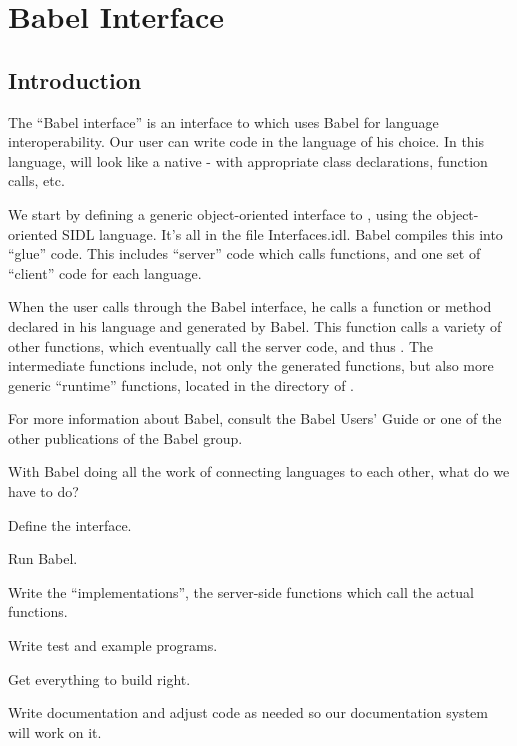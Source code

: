 
\chapter{Babel Interface}
\label{ch-babel}

\section{Introduction}

The ``Babel interface'' is an interface to \hypre{} which uses Babel
for language interoperability.  Our user can write code in the
language of his choice. In this language, \hypre{} will look like a
native - with appropriate class declarations, function calls, etc.

We start by defining a generic object-oriented interface to \hypre{},
using the object-oriented SIDL language.  It's all in the file
Interfaces.idl.  Babel compiles this into ``glue'' code.  This
includes ``server'' code which calls \hypre{} functions, and one set
of ``client'' code for each language.

When the user calls \hypre{} through the Babel interface, he calls a
function or method declared in his language and generated by Babel.
This function calls a variety of other functions, which eventually
call the server code, and thus \hypre{}.  The intermediate functions
include, not only the generated functions, but also more generic
``runtime'' functions, located in the  directory
of \hypre{}.

For more information about Babel, consult the Babel Users' Guide or
one of the other publications of the Babel group.

With Babel doing all the work of connecting languages to each other,
what do we have to do?
\begin{list}{.}{\setlength{\itemsep}{0in}}
\item Define the \hypre{} interface.
\item Run Babel.
\item Write the ``implementations'', the server-side functions which
call the actual \hypre{} functions.
\item Write test and example programs.
\item Get everything to build right.
\item Write documentation and adjust code as needed so our
documentation system will work on it.
\end{list}

